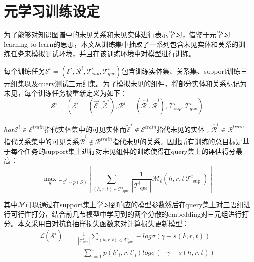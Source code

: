 \section{元学习训练设定}
为了能够对知识图谱中的未见关系和未见实体进行表示学习，借鉴于元学习learning to learn的思想，本文从训练集中抽取了一系列包含未见实体和关系的训练任务来模拟测试环境，并且在该训练环境中对模型进行训练。

每个训练任务\(\mathcal{S}^{i} = (\mathcal{E}^{i}, \mathcal{R}^{i}, \mathcal{T}^{i}_{sup},\mathcal{T}^{i}_{que})\)包含训练实体集、关系集、support训练三元组集以及query测试三元组集。为了模拟未见的组件，将部分实体和关系标记为未见，每个训练任务被重新定义为如下：
\begin{equation}
  \mathcal{S}^{i} = (\mathcal{E}^{i} = (\hat{\mathcal{E}}^{i},\tilde{\mathcal{E}}^{i}), \mathcal{R}^{i} = (\hat{\mathcal{R}}^{i} ,\tilde{\mathcal{R}}^{i}   ), \mathcal{T}^{i}_{sup},\mathcal{T}^{i}_{que})  \label{eq:3-15}
\end{equation}

\(hat{\mathcal{E}}^{i} \in \mathcal{E}^{train}\)指代实体集中的可见实体而\(\tilde{\mathcal{E}}^{i} \notin \mathcal{E}^{train}\)指代未见的实体；\(\hat{\mathcal{R}}^{i} \in \mathcal{R}^{train}\)指代关系集中的可见关系\(\tilde{\mathcal{R}}^{i} \notin \mathcal{R}^{train}\)指代未见的关系。因此所有训练的总目标是基于每个任务的support集上进行对未见组件的训练使得在query集上的评估得分最高：
\begin{equation}
  \max\limits_{ \theta } \mathbb{E} _ { S ^ { i } \sim p ( S ) } \left[ \sum\limits_{ ( h , r , t ) \in \mathcal{T} _ { \text { que } } ^ { i } } \frac { 1 } { | \mathcal{T} _ { \text { que } } ^ { i } | } \mathcal{M} _ { \theta } ( h , r , t | \mathcal{T} _ { \text { sup } } ^ { i } ) \right] \label{eq:3-16}
\end{equation}

其中\(\mathcal{M}\)可以通过在support集上学习到响应的模型参数然后在query集上对三语组进行可行性打分，结合前几节模型中学习到的两个分散的embedding对三元组进行打分。本文采用自对抗负抽样损失函数来对计算损失更新模型：
\begin{equation}
\begin{aligned}
  \mathcal{L}(\mathcal{S}^{i}) = &\frac{1}{|\mathcal{T}^{i}_{que}|} \sum\limits_{(h,r,t)\in\mathcal{T}^{i}_{que}}-log\sigma(\gamma + s(h,r,t)) \\
  &-\sum\limits_{i=1}^{n}p(h'_{i},r,t'_{i})log\sigma(-\gamma - s(h,r,t)) \label{eq:3-17}
\end{aligned}
\end{equation}

